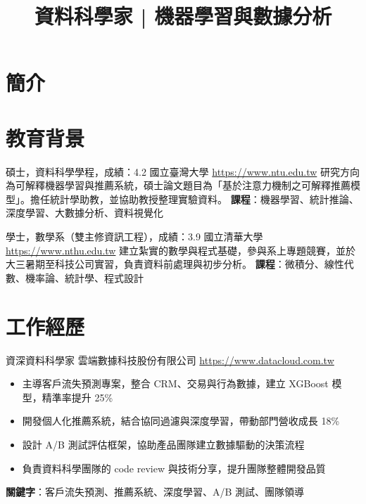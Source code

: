 \documentclass[a4paper, serif, 10pt]{moderncv}
\title{資料科學家 | 機器學習與數據分析}
\begin{document}
\maketitle

\section{簡介}

\section{教育背景}

        {碩士，資料科學學程，成績：4.2}
        {國立臺灣大學}
        {\url{https://www.ntu.edu.tw}}
        {}
        {研究方向為可解釋機器學習與推薦系統，碩士論文題目為「基於注意力機制之可解釋推薦模型」。擔任統計學助教，並協助教授整理實驗資料。
\textbf{課程}：機器學習、統計推論、深度學習、大數據分析、資料視覺化}

        {學士，數學系（雙主修資訊工程），成績：3.9}
        {國立清華大學}
        {\url{https://www.nthu.edu.tw}}
        {}
        {建立紮實的數學與程式基礎，參與系上專題競賽，並於大三暑期至科技公司實習，負責資料前處理與初步分析。
\textbf{課程}：微積分、線性代數、機率論、統計學、程式設計}
\section{工作經歷}

        {資深資料科學家}
        {雲端數據科技股份有限公司}
        {\url{https://www.datacloud.com.tw}}
        {}
        {\begin{itemize}
\item 主導客戶流失預測專案，整合 CRM、交易與行為數據，建立 XGBoost 模型，精準率提升 25\%
\item 開發個人化推薦系統，結合協同過濾與深度學習，帶動部門營收成長 18\%
\item 設計 A/B 測試評估框架，協助產品團隊建立數據驅動的決策流程
\item 負責資料科學團隊的 code review 與技術分享，提升團隊整體開發品質
\end{itemize}
\textbf{關鍵字}：客戶流失預測、推薦系統、深度學習、A/B 測試、團隊領導}
\end{document}
